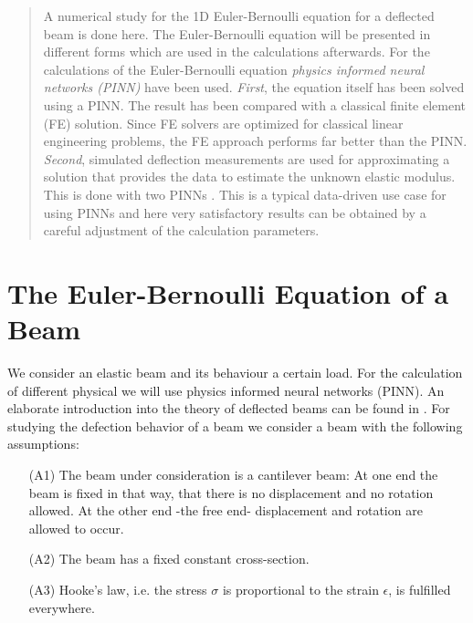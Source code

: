 \documentclass[a4paper,11pt]{article}
\begin{document}
\begin{abstract}
A numerical study for the 1D Euler-Bernoulli equation for a deflected beam is done here. The Euler-Bernoulli equation will be presented in different forms which are used in the calculations afterwards. For the calculations of the Euler-Bernoulli equation \emph{physics informed neural networks (PINN)} have been used. \emph{First}, the equation itself has been solved using a PINN. The result has been compared with a classical finite element (FE) solution. Since FE solvers are optimized for classical linear engineering problems, the FE approach performs far better than the PINN. \emph{Second}, simulated deflection measurements are used for approximating a solution that provides the data to estimate the unknown elastic modulus. This is done with two PINNs . This is a typical data-driven use case for using PINNs and here very satisfactory results can be obtained by a careful adjustment of the calculation parameters.
\end{abstract}

\tableofcontents
\newpage

\section{The Euler-Bernoulli Equation of a Beam}

We consider an elastic beam and its behaviour a certain load. For the calculation of different physical we will use physics informed neural networks (PINN). An elaborate introduction into the theory of deflected beams can be found in \cite[pp. 88]{gross2007mechanics}.
For studying the defection behavior of a beam we consider a beam with the following assumptions:
\begin{enumerate}
\item[(A1)] The beam under consideration is a cantilever beam: At one end the beam is fixed in that way, that there is no displacement and no rotation allowed. At the other end -the free end- displacement and rotation are allowed to occur.
\item[(A2)] The beam has a fixed constant cross-section.
\item[(A3)] Hooke's law, i.e. the stress $\sigma $ is proportional to the strain $\epsilon$, is fulfilled everywhere.
\end{enumerate}
\end{document}
